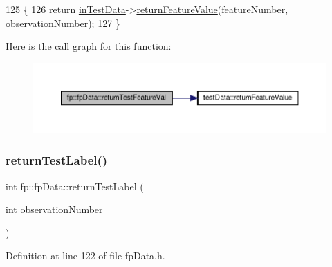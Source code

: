 \begin{DoxyCode}
125                                                                                                     \{
126                 \textcolor{keywordflow}{return} \hyperlink{classfp_1_1fpData_ad4f4dd3a8d15633b7f983932fa60bbad}{inTestData}->\hyperlink{classtestData_aec2686210c4776df10cc0658133ed4ad}{returnFeatureValue}(featureNumber, 
      observationNumber);
127             \}
\end{DoxyCode}
Here is the call graph for this function\+:\nopagebreak
\begin{figure}[H]
\begin{center}
\leavevmode
\includegraphics[width=350pt]{classfp_1_1fpData_a42f76961f1649e329d654e9e1bb13fc6_cgraph}
\end{center}
\end{figure}
\mbox{\label{classfp_1_1fpData_a50b6343c52560d1992de50e8cd6b1206}} 
\subsubsection{\texorpdfstring{return\+Test\+Label()}{returnTestLabel()}}
{\footnotesize\ttfamily int fp\+::fp\+Data\+::return\+Test\+Label (\begin{DoxyParamCaption}\item[{int}]{observation\+Number }\end{DoxyParamCaption})\hspace{0.3cm}{\ttfamily [inline]}}



Definition at line 122 of file fp\+Data.\+h.


